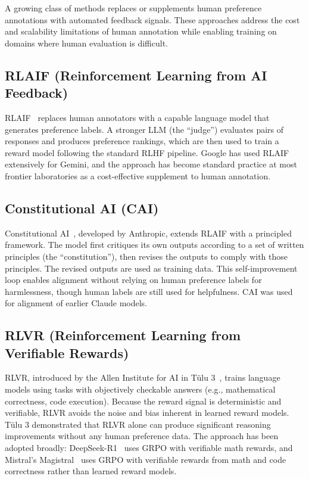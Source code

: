 \documentclass[12pt]{article}
\begin{document}
A growing class of methods replaces or supplements human preference annotations with automated feedback signals. These approaches address the cost and scalability limitations of human annotation while enabling training on domains where human evaluation is difficult.

\subsection{RLAIF (Reinforcement Learning from AI Feedback)}

RLAIF~\cite{Lee2023RLAIF} replaces human annotators with a capable language model that generates preference labels. A stronger LLM (the ``judge'') evaluates pairs of responses and produces preference rankings, which are then used to train a reward model following the standard RLHF pipeline. Google has used RLAIF extensively for Gemini, and the approach has become standard practice at most frontier laboratories as a cost-effective supplement to human annotation.

\subsection{Constitutional AI (CAI)}

Constitutional AI~\cite{Bai2022Constitutional}, developed by Anthropic, extends RLAIF with a principled framework. The model first critiques its own outputs according to a set of written principles (the ``constitution''), then revises the outputs to comply with those principles. The revised outputs are used as training data. This self-improvement loop enables alignment without relying on human preference labels for harmlessness, though human labels are still used for helpfulness. CAI was used for alignment of earlier Claude models.

\subsection{RLVR (Reinforcement Learning from Verifiable Rewards)}

RLVR, introduced by the Allen Institute for AI in T\"ulu 3~\cite{Lambert2024Tulu3}, trains language models using tasks with objectively checkable answers (e.g., mathematical correctness, code execution). Because the reward signal is deterministic and verifiable, RLVR avoids the noise and bias inherent in learned reward models. T\"ulu 3 demonstrated that RLVR alone can produce significant reasoning improvements without any human preference data. The approach has been adopted broadly: DeepSeek-R1~\cite{Guo2025DeepSeekR1} uses GRPO with verifiable math rewards, and Mistral's Magistral~\cite{Mistral2025Magistral} uses GRPO with verifiable rewards from math and code correctness rather than learned reward models.
\end{document}
